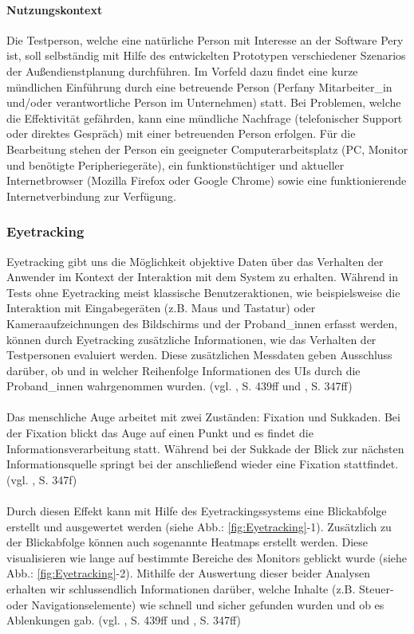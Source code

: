 \documentclass[Bachelorarbeit.tex]{subfiles}
\begin{document}
\paragraph{Nutzungskontext}
\label{Nutzungskontext}
Die Testperson, welche eine natürliche Person mit Interesse an der Software Pery ist, soll selbständig mit Hilfe des entwickelten Prototypen verschiedener Szenarios der Außendienstplanung durchführen. 
Im Vorfeld dazu findet eine kurze mündlichen Einführung durch eine betreuende Person (Perfany Mitarbeiter\_in und/oder verantwortliche Person im Unternehmen) statt.
Bei Problemen, welche die Effektivität gefährden, kann eine mündliche Nachfrage (telefonischer Support oder direktes Gespräch) mit einer betreuenden Person erfolgen. 
Für die Bearbeitung stehen der Person ein geeigneter Computerarbeitsplatz (PC, Monitor und benötigte Peripheriegeräte), ein funktionstüchtiger und aktueller Internetbrowser (Mozilla Firefox oder Google Chrome) sowie eine funktionierende Internetverbindung zur Verfügung.


\subsubsection{Eyetracking}
\label{Eyetracking}

Eyetracking gibt uns die Möglichkeit objektive Daten über das Verhalten der Anwender im Kontext der Interaktion mit dem System zu erhalten.
Während in Tests ohne Eyetracking meist klassische Benutzeraktionen, wie beispielsweise die Interaktion mit Eingabegeräten (z.B. Maus und Tastatur) oder Kameraaufzeichnungen des Bildschirms und der Proband\_innen erfasst werden, können durch Eyetracking zusätzliche Informationen, wie das Verhalten der Testpersonen evaluiert werden.
Diese zusätzlichen Messdaten geben Ausschluss darüber, ob und in welcher Reihenfolge Informationen des \ac{UI}s durch die Proband\_innen wahrgenommen wurden. (vgl. \cite{Niegemann2008}, S. 439ff und \cite{Burmester}, S. 347ff)\\
\\
Das menschliche Auge arbeitet mit zwei Zuständen: Fixation und Sukkaden.
Bei der Fixation blickt das Auge auf einen Punkt und es findet die Informationsverarbeitung statt. 
Während bei der Sukkade der Blick zur nächsten Informationsquelle springt bei der anschließend wieder eine Fixation stattfindet. (vgl. \cite{Burmester}, S. 347f)\\
\\
Durch diesen Effekt kann mit Hilfe des Eyetrackingssystems eine Blickabfolge erstellt und ausgewertet werden (siehe Abb.: \ref{fig:Eyetracking}-1).
Zusätzlich zu der Blickabfolge können auch sogenannte Heatmaps erstellt werden. 
Diese visualisieren wie lange auf bestimmte Bereiche des Monitors geblickt wurde (siehe Abb.: \ref{fig:Eyetracking}-2).
Mithilfe der Auswertung dieser beider Analysen erhalten wir schlussendlich Informationen darüber, welche Inhalte (z.B. Steuer- oder Navigationselemente) wie schnell und sicher gefunden wurden und ob es Ablenkungen gab. (vgl. \cite{Niegemann2008}, S. 439ff und \cite{Burmester}, S. 347ff)
\end{document}
